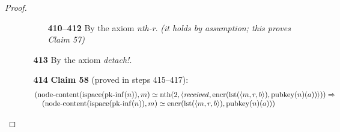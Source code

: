\documentclass[11pt]{article}
\theoremstyle{plain}
\begin{document}
\begin{proof}
\begin{itemize}[leftmargin=2.8em, itemsep=4pt, parsep=1pt]
\begin{itemize}[leftmargin=2.8em, itemsep=4pt, parsep=1pt]
  \begin{itemize}[leftmargin=2.8em, itemsep=4pt, parsep=1pt]
  \item[\textbf{410--412}] By the axiom \emph{nth-r}.  \emph{(it holds by assumption; this proves Claim 57)}
  \end{itemize}
  \item[\textbf{413}] By the axiom \emph{detach!}.
  \item[\textbf{414}] \textbf{Claim 58} (proved in steps 415--417):
\begin{equation*}
\begin{array}{@{}l@{}} (\operatorname{node\text{-}content}(\operatorname{ispace}(\operatorname{pk\text{-}inf}(n)), m) \simeq \operatorname{nth}(2, \langle \mathit{received}, \operatorname{encr}(\operatorname{lst}(\langle m, r, b \rangle), \operatorname{pubkey}(n)(a)) \rangle)) \Rightarrow \\ \quad (\operatorname{node\text{-}content}(\operatorname{ispace}(\operatorname{pk\text{-}inf}(n)), m) \simeq \operatorname{encr}(\operatorname{lst}(\langle m, r, b \rangle), \operatorname{pubkey}(n)(a))) \end{array}
\end{equation*}


\end{itemize}
\end{itemize}
\end{proof}
\end{document}
